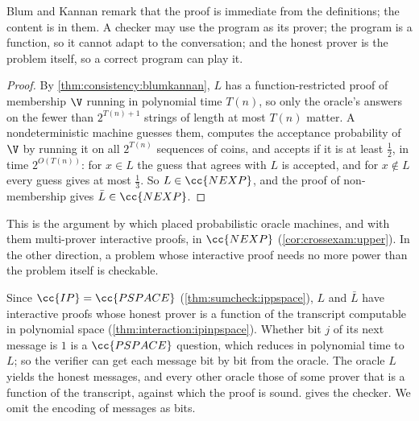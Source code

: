 \begin{refsection}
Blum and Kannan remark that the proof is immediate from the definitions; the content is in them. A checker may use the program as its prover; the program is a function, so it cannot adapt to the conversation; and the honest prover is the problem itself, so a correct program can play it.


\begin{proof}
By \cref{thm:consistency:blumkannan}, $L$ has a function-restricted proof of membership $\V$ running in polynomial time $T(n)$, so only the oracle's answers on the fewer than $2^{T(n)+1}$ strings of length at most $T(n)$ matter. A nondeterministic machine guesses them, computes the acceptance probability of $\V$ by running it on all $2^{T(n)}$ sequences of coins, and accepts if it is at least $\frac12$, in time $2^{O(T(n))}$: for $x\in L$ the guess that agrees with $L$ is accepted, and for $x\notin L$ every guess gives at most $\frac13$. So $L\in\cc{NEXP}$, and the proof of non-membership gives $\bar L\in\cc{NEXP}$.
\end{proof}

This is the argument by which \textcite{FortnowRompelSipser1994} placed probabilistic oracle machines, and with them multi-prover interactive proofs, in $\cc{NEXP}$ (\cref{cor:crossexam:upper}). In the other direction, a problem whose interactive proof needs no more power than the problem itself is checkable.


\begin{proofsketch}
Since $\cc{IP}=\cc{PSPACE}$ (\cref{thm:sumcheck:ippspace}), $L$ and $\bar L$ have interactive proofs whose honest prover is a function of the transcript computable in polynomial space (\cref{thm:interaction:ipinpspace}). Whether bit $j$ of its next message is $1$ is a $\cc{PSPACE}$ question, which reduces in polynomial time to $L$; so the verifier can get each message bit by bit from the oracle. The oracle $L$ yields the honest messages, and every other oracle those of some prover that is a function of the transcript, against which the proof is sound.  gives the checker. We omit the encoding of messages as bits.
\end{proofsketch}


\end{refsection}
